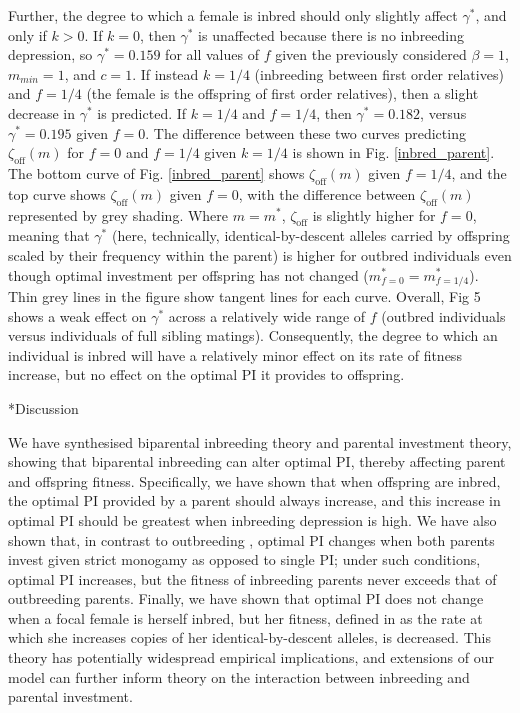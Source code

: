 \documentclass[12pt]{article}
\makeatletter
\renewcommand\section{\@startsection{section}{1}{0in}{-0.5\baselineskip}{0.1\baselineskip}{\normalfont\large\bfseries}}
\makeatother
\begin{document}
Further, the degree to which a female is inbred should only slightly affect $\gamma^{*}$, and only if $k>0$. If $k=0$, then $\gamma^{*}$ is unaffected because there is no inbreeding depression, so $\gamma^{*}=0.159$ for all values of $f$ given the previously considered $\beta=1$, $m_{min}=1$, and $c=1$. If instead $k=1/4$ (inbreeding between first order relatives) and $f=1/4$ (the female is the offspring of first order relatives), then a slight decrease in $\gamma^{*}$ is predicted. If $k=1/4$ and $f=1/4$, then $\gamma^{*}=0.182$, versus $\gamma^{*}=0.195$ given $f=0$. The difference between these two curves predicting $\zeta_{\textrm{off}}(m)$ for $f=0$ and $f=1/4$ given $k=1/4$ is shown in Fig. \ref{inbred_parent}. The bottom curve of Fig. \ref{inbred_parent} shows $\zeta_{\textrm{off}}(m)$ given $f=1/4$, and the top curve shows $\zeta_{\textrm{off}}(m)$ given $f=0$, with the difference between $\zeta_{\textrm{off}}(m)$ represented by grey shading. Where $m=m^{*}$, $\zeta_{\textrm{off}}$ is slightly higher for $f=0$, meaning that $\gamma^{*}$ (here, technically, identical-by-descent alleles carried by offspring scaled by their frequency within the parent) is higher for outbred individuals even though optimal investment per offspring has not changed ($m^{*}_{f=0}=m^{*}_{f=1/4}$). Thin grey lines in the figure show tangent lines for each curve. Overall, Fig 5 shows a weak effect on $\gamma^{*}$ across a relatively wide range of $f$ (outbred individuals versus individuals of full sibling matings). Consequently, the degree to which an individual is inbred will have a relatively minor effect on its rate of fitness increase, but no effect on the optimal PI it provides to offspring.

\section*{Discussion}

We have synthesised biparental inbreeding theory and parental investment theory, showing that biparental inbreeding can alter optimal PI, thereby affecting parent and offspring fitness. Specifically, we have shown that when offspring are inbred, the optimal PI provided by a parent should always increase, and this increase in optimal PI should be greatest when inbreeding depression is high. We have also shown that, in contrast to outbreeding \cite[][]{Parker1985}, optimal PI changes when both parents invest given strict monogamy as opposed to single PI; under such conditions, optimal PI increases, but the fitness of inbreeding parents never exceeds that of outbreeding parents. Finally, we have shown that optimal PI does not change when a focal female is herself inbred, but her fitness, defined in as the rate at which she increases copies of her identical-by-descent alleles, is decreased. This theory has potentially widespread empirical implications, and extensions of our model can further inform theory on the interaction between inbreeding and parental investment.
\end{document}
